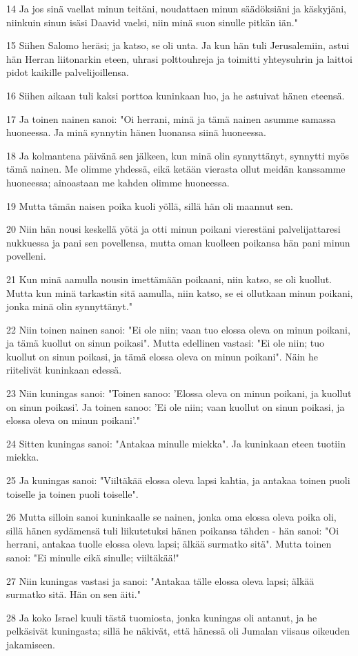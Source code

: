 \par 14 Ja jos sinä vaellat minun teitäni, noudattaen minun säädöksiäni ja käskyjäni, niinkuin sinun isäsi Daavid vaelsi, niin minä suon sinulle pitkän iän."
\par 15 Siihen Salomo heräsi; ja katso, se oli unta. Ja kun hän tuli Jerusalemiin, astui hän Herran liitonarkin eteen, uhrasi polttouhreja ja toimitti yhteysuhrin ja laittoi pidot kaikille palvelijoillensa.
\par 16 Siihen aikaan tuli kaksi porttoa kuninkaan luo, ja he astuivat hänen eteensä.
\par 17 Ja toinen nainen sanoi: "Oi herrani, minä ja tämä nainen asumme samassa huoneessa. Ja minä synnytin hänen luonansa siinä huoneessa.
\par 18 Ja kolmantena päivänä sen jälkeen, kun minä olin synnyttänyt, synnytti myös tämä nainen. Me olimme yhdessä, eikä ketään vierasta ollut meidän kanssamme huoneessa; ainoastaan me kahden olimme huoneessa.
\par 19 Mutta tämän naisen poika kuoli yöllä, sillä hän oli maannut sen.
\par 20 Niin hän nousi keskellä yötä ja otti minun poikani vierestäni palvelijattaresi nukkuessa ja pani sen povellensa, mutta oman kuolleen poikansa hän pani minun povelleni.
\par 21 Kun minä aamulla nousin imettämään poikaani, niin katso, se oli kuollut. Mutta kun minä tarkastin sitä aamulla, niin katso, se ei ollutkaan minun poikani, jonka minä olin synnyttänyt."
\par 22 Niin toinen nainen sanoi: "Ei ole niin; vaan tuo elossa oleva on minun poikani, ja tämä kuollut on sinun poikasi". Mutta edellinen vastasi: "Ei ole niin; tuo kuollut on sinun poikasi, ja tämä elossa oleva on minun poikani". Näin he riitelivät kuninkaan edessä.
\par 23 Niin kuningas sanoi: "Toinen sanoo: 'Elossa oleva on minun poikani, ja kuollut on sinun poikasi'. Ja toinen sanoo: 'Ei ole niin; vaan kuollut on sinun poikasi, ja elossa oleva on minun poikani'."
\par 24 Sitten kuningas sanoi: "Antakaa minulle miekka". Ja kuninkaan eteen tuotiin miekka.
\par 25 Ja kuningas sanoi: "Viiltäkää elossa oleva lapsi kahtia, ja antakaa toinen puoli toiselle ja toinen puoli toiselle".
\par 26 Mutta silloin sanoi kuninkaalle se nainen, jonka oma elossa oleva poika oli, sillä hänen sydämensä tuli liikutetuksi hänen poikansa tähden - hän sanoi: "Oi herrani, antakaa tuolle elossa oleva lapsi; älkää surmatko sitä". Mutta toinen sanoi: "Ei minulle eikä sinulle; viiltäkää!"
\par 27 Niin kuningas vastasi ja sanoi: "Antakaa tälle elossa oleva lapsi; älkää surmatko sitä. Hän on sen äiti."
\par 28 Ja koko Israel kuuli tästä tuomiosta, jonka kuningas oli antanut, ja he pelkäsivät kuningasta; sillä he näkivät, että hänessä oli Jumalan viisaus oikeuden jakamiseen.

